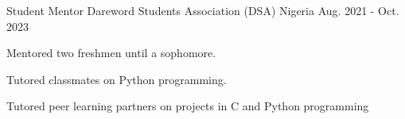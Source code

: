 

\begin{cventries}

  \cventry
    {Student Mentor} %
    {Dareword Students Association (DSA) } %
    {Nigeria} %
    {Aug. 2021 - Oct. 2023} %
    {
      \begin{cvitems} %
        \item {Mentored two freshmen until a sophomore.}
        \item {Tutored classmates on Python programming.}
        \item {Tutored peer learning partners on projects in C and Python programming}
      \end{cvitems}
    }
\end{cventries}
